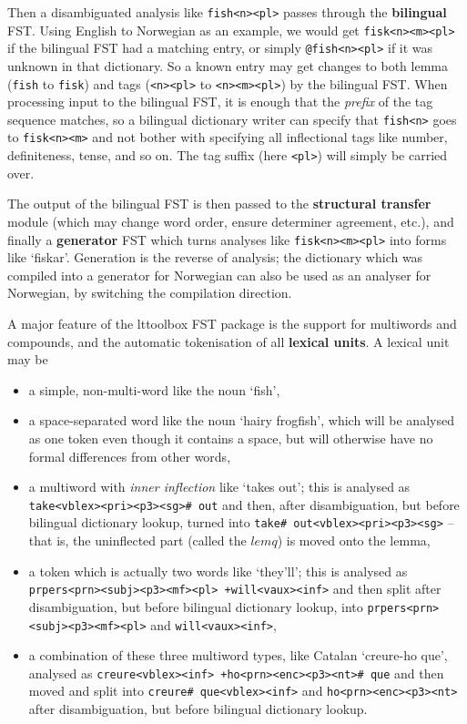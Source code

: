 \documentclass[10pt, a4paper]{article}
\newcommand{\ana}[1]{\texttt{#1}}
\newcommand{\f}[1]{`#1'}
\begin{document}
Then a disambiguated analysis like \ana{fish<n><pl>} passes through
the \textbf{bilingual} FST. Using English to Norwegian as an example,
we would get \ana{fisk<n><m><pl>} if the bilingual FST had a matching
entry, or simply \ana{@fish<n><pl>} if it was unknown in that
dictionary. So a known entry may get changes to both lemma (\ana{fish}
to \ana{fisk}) and tags (\ana{<n><pl>} to \ana{<n><m><pl>}) by the
bilingual FST. When processing input to the bilingual FST, it is
enough that the \emph{prefix} of the tag sequence matches, so a
bilingual dictionary writer can specify that \ana{fish<n>} goes to
\ana{fisk<n><m>} and not bother with specifying all inflectional tags
like number, definiteness, tense, and so on. The tag suffix (here
\ana{<pl>}) will simply be carried over.

The output of the bilingual FST is then passed to the
\textbf{structural transfer} module (which may change word order,
ensure determiner agreement, etc.), and finally a \textbf{generator}
FST which turns analyses like \ana{fisk<n><m><pl>} into forms like
\f{fiskar}. Generation is the reverse of analysis; the dictionary
which was compiled into a generator for Norwegian can also be used as
an analyser for Norwegian, by switching the compilation direction.

A major feature of the lttoolbox FST package is the support
for multiwords and compounds, and the automatic tokenisation of all
\textbf{lexical units}. A lexical unit may be
\begin{itemize}
\item a simple, non-multi-word like the noun \f{fish},
\item a space-separated word like the noun \f{hairy frogfish}, which
  will be analysed as one token even though it contains a space, but
  will otherwise have no formal
  differences from other words,
\item a multiword with \emph{inner inflection} like \f{takes out}; this is
  analysed as \ana{take<vblex><pri><p3><sg>\# out} and then, after
  disambiguation, but before bilingual dictionary lookup, turned into
  \ana{take\# out<vblex><pri><p3><sg>} -- that is, the uninflected part
  (called the $lemq$) is moved onto the lemma,
\item a token which is actually two words like \f{they'll}; this is
  analysed as \ana{prpers<prn><subj><p3><mf><pl> +will<vaux><inf>} and
  then split after disambiguation, but before bilingual dictionary
  lookup, into \ana{prpers<prn><subj><p3><mf><pl>} and
  \ana{will<vaux><inf>},
\item a combination of these three multiword types, like Catalan
  \f{creure-ho que}, analysed as \ana{creure<vblex><inf>
    +ho<prn><enc><p3><nt>\# que} and then moved and split into
  \ana{creure\# que<vblex><inf>} and \ana{ho<prn><enc><p3><nt>} after
  disambiguation, but before bilingual dictionary lookup.
\end{itemize}
\end{document}
